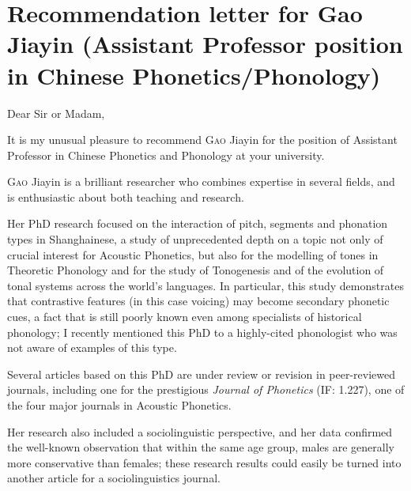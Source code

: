 \documentclass[oldfontcommands,oneside,a4paper,11pt]{article}
\begin{document}
 
{
}

\section*{Recommendation letter for Gao Jiayin (Assistant  Professor  position  in  Chinese  Phonetics/Phonology)}


\begin{center}

 Dear Sir or Madam, 
\end{center}  

It is my unusual pleasure to recommend \textsc{Gao} Jiayin for the position of Assistant Professor in Chinese Phonetics and Phonology at your university.

\textsc{Gao} Jiayin is a brilliant researcher who combines expertise in several fields, and is enthusiastic about both teaching and research.

Her PhD research focused on the interaction of pitch, segments and phonation types in Shanghainese, a study of unprecedented depth on a topic not only of crucial interest for Acoustic Phonetics, but also for the modelling of tones in Theoretic Phonology and  for the study of Tonogenesis and of the evolution of tonal systems across the world's languages. In particular, this study demonstrates that contrastive features (in this case voicing) may become secondary phonetic cues, a fact that is still poorly known even among specialists of historical phonology; I recently mentioned this PhD to a highly-cited phonologist who was not aware of examples of this type.

Several articles based on this PhD are under review or revision in peer-reviewed journals, including one for the prestigious \textit{Journal of Phonetics} (IF: 1.227), one of the four major journals in Acoustic Phonetics.

Her research also included a sociolinguistic perspective, and her data confirmed the well-known observation that within the same age group, males are generally more conservative than females; these research results could easily be turned into another article for a sociolinguistics journal. 
\end{document}
